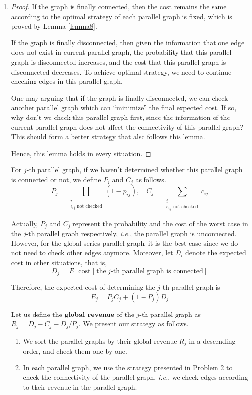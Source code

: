 \documentclass{oxmathproblems}
\makeatletter
\theoremstyle{definition}
\renewenvironment{solution}[1][Solution] {\par\pushQED{\qed}\normalfont\topsep6\p@\@plus6\p@\relax\trivlist\item[\hskip\labelsep\bfseries#1\@addpunct{.}]\ignorespaces}{\popQED\endtrivlist\@endpefalse} \makeatother
\makeatother
\begin{document}
\begin{enumerate}
\begin{solution}
\begin{proof}
		If the graph is finally connected, then the cost remains the same according to the optimal strategy of each parallel graph is fixed, which is proved by Lemma \ref{lemma8}.
		
		If the graph is finally disconnected, then given the information that one edge does not exist in current parallel graph, the probability that this parallel graph is disconnected increases, and the cost that this parallel graph is disconnected decreases. To achieve optimal strategy, we need to continue checking edges in this parallel graph.
		
		One may arguing that if the graph is finally disconnected, we can check another parallel graph which can ``minimize'' the final expected cost. If so, why don't we check this parallel graph first, since the information of the current parallel graph does not affect the connectivity of this parallel graph? This should form a better strategy that also follows this lemma.
		
		Hence, this lemma holds in every situation.
	\end{proof}
	
	For $j$-th parallel graph, if we haven't determined whether this parallel graph is connected or not, we define $P_j$ and $C_j$ as follows.
	$$
	P_j = \prod_{\substack{i \\ e_{ij} \textrm{ not checked}}} (1 - p_{ij}), \quad C_j = \sum_{\substack{i \\ e_{ij} \textrm{ not checked}}} c_{ij}
	$$
	
	Actually, $P_j$ and $C_j$ represent the probability and the cost of the worst case in the $j$-th parallel graph respectively, \textit{i.e.}, the parallel graph is unconnected. However, for the global series-parallel graph, it is the best case since we do not need to check other edges anymore. Moreover, let $D_i$ denote the expected cost in other situations, that is,
	$$
	D_j = E[\textrm{cost} \mid \textrm{the $j$-th parallel graph is connected}]
	$$
	
	Therefore, the expected cost of determining the $j$-th parallel graph is
	$$
	E_j = P_jC_j + (1-P_j)D_j
	$$
	
	Let us define the \textbf{global revenue} of the $j$-th parallel graph as $R_j = D_j - C_j - D_j / P_j$. We present our strategy as follows.
	{\color{blue}
	\begin{enumerate}
		\item We sort the parallel graphs by their global revenue $R_j$ in a descending order, and check them one by one.
		\item In each parallel graph, we use the strategy presented in Problem 2 to check the connectivity of the parallel graph, \textit{i.e.}, we check edges according to their revenue in the parallel graph.
	\end{enumerate}
	}
	

\end{solution}
\end{enumerate}
\end{document}
